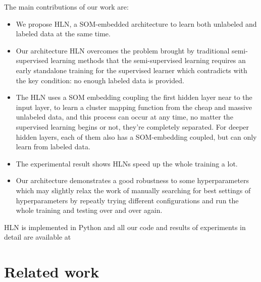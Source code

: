 \documentclass[3p,times,procedia]{elsarticle}
\begin{document}
The main contributions of our work are:
\begin{itemize}
\item We propose HLN, a SOM-embedded 
architecture to learn both unlabeled 
and labeled data at the same time.
\item Our architecture HLN overcomes
the problem brought by traditional 
semi-supervised learning methods that 
the semi-supervised learning requires
an early standalone training for the
supervised learner which contradicts
with the key condition: no enough 
labeled data is provided.
\item The HLN uses a SOM embedding 
coupling the first hidden layer near 
to the input layer, to learn a cluster 
mapping function from the cheap and 
massive unlabeled data, and this process
can occur at any time, no matter the 
supervised learning begins or not,
they're completely separated.
For deeper hidden layers, each of them 
also has a SOM-embedding coupled, 
but can only learn from labeled data.
\item The experimental result shows HLNs
speed up the whole training a lot.
\item Our architecture demonstrates a 
good robustness to some hyperparameters
which may slightly relax the work of 
manually searching for best settings
of hyperparameters by repeatly trying
different configurations and run the
whole training and testing over and 
over again.
\end{itemize}
HLN is implemented in Python and all
our code and results of experiments
in detail are available at 




\section{Related work}
\end{document}
